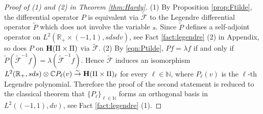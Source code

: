 \documentclass[12pt,leqno]{amsart}
\theoremstyle{plain}
\theoremstyle{definition}
\begin{document}
\begin{proof}
[Proof of (1) and (2) in Theorem \ref{thm:Hardy}]
(1)\enspace
By Proposition \ref{prop:Ftilde}, 
 the differential operator $P$ is equivalent via $\widetilde {\mathcal{F}}$
 to the Legendre differential operator $\widetilde P$
 which does not involve the variable $s$.  
Since $\widetilde P$ defines a self-adjoint operator
 on $L^2({\mathbb{R}}_+ \times (-1,1), s d s d v)$, 
 see Fact \ref{fact:legendre} (2) in Appendix, 
 so does $P$ on ${\bf{H}}(\Pi \times \Pi)$
 via $\widetilde{\mathcal{F}}$.  
\newline
(2)\enspace
By \eqref{eqn:Ptilde}, 
 $P f = \lambda f$
 if and only if $\widetilde P(\widetilde{\mathcal{F}}^{-1}f)=\lambda(\widetilde{\mathcal{F}}^{-1} f)$.  
Hence $\widetilde{\mathcal{F}}$ induces an isomorphism
 $L^2({\mathbb{R}}_+, s d s) \otimes {\mathbb{C}} P_{\ell}(v)
\overset \sim \rightarrow {\bf{H}}(\Pi \times \Pi)_{\ell}$
  for every $\ell \in {\mathbb{N}}$, 
 where $P_{\ell}(v)$ is the $\ell$-th Legendre polynomial.  
Therefore the proof of the second statement
 is reduced to the classical theorem 
 that $\{P_{\ell}\}_{\ell \in {\mathbb{N}}}$
 forms an orthogonal basis
 in $L^2((-1,1), d v)$, 
 see Fact \ref{fact:legendre} (1).  
\end{proof}
\end{document}

